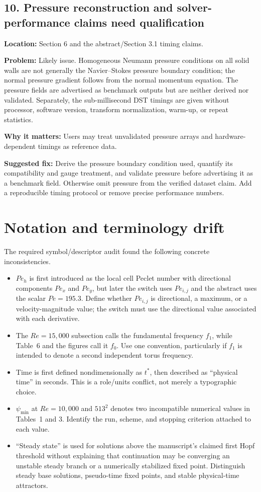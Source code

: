 \documentclass[11pt]{article}
\newcommand{\location}[1]{\textbf{Location:} #1\par}
\newcommand{\problem}[1]{\textbf{Problem:} #1\par}
\newcommand{\impact}[1]{\textbf{Why it matters:} #1\par}
\newcommand{\fixit}[1]{\textbf{Suggested fix:} #1\par}
\begin{document}
\subsection*{10. Pressure reconstruction and solver-performance claims need qualification}

\location{Section 6 and the abstract/Section 3.1 timing claims.}
\problem{Likely issue.  Homogeneous Neumann pressure conditions on all solid walls are not generally the Navier--Stokes pressure boundary condition; the normal pressure gradient follows from the normal momentum equation.  The pressure fields are advertised as benchmark outputs but are neither derived nor validated.  Separately, the sub-millisecond DST timings are given without processor, software version, transform normalization, warm-up, or repeat statistics.}
\impact{Users may treat unvalidated pressure arrays and hardware-dependent timings as reference data.}
\fixit{Derive the pressure boundary condition used, quantify its compatibility and gauge treatment, and validate pressure before advertising it as a benchmark field.  Otherwise omit pressure from the verified dataset claim.  Add a reproducible timing protocol or remove precise performance numbers.}

\section*{Notation and terminology drift}

The required symbol/descriptor audit found the following concrete inconsistencies.

\begin{itemize}
  \item $Pe_h$ is first introduced as the local cell Peclet number with directional components $Pe_x$ and $Pe_y$, but later the switch uses $Pe_{i,j}$ and the abstract uses the scalar $Pe=195.3$.  Define whether $Pe_{i,j}$ is directional, a maximum, or a velocity-magnitude value; the switch must use the directional value associated with each derivative.
  \item The $Re=15{,}000$ subsection calls the fundamental frequency $f_1$, while Table~6 and the figures call it $f_0$.  Use one convention, particularly if $f_1$ is intended to denote a second independent torus frequency.
  \item Time is first defined nondimensionally as $t^*$, then described as ``physical time'' in seconds.  This is a role/units conflict, not merely a typographic choice.
  \item $\psi_{\min}$ at $Re=10{,}000$ and $513^2$ denotes two incompatible numerical values in Tables~1 and 3.  Identify the run, scheme, and stopping criterion attached to each value.
  \item ``Steady state'' is used for solutions above the manuscript's claimed first Hopf threshold without explaining that continuation may be converging an unstable steady branch or a numerically stabilized fixed point.  Distinguish steady base solutions, pseudo-time fixed points, and stable physical-time attractors.
\end{itemize}
\end{document}
